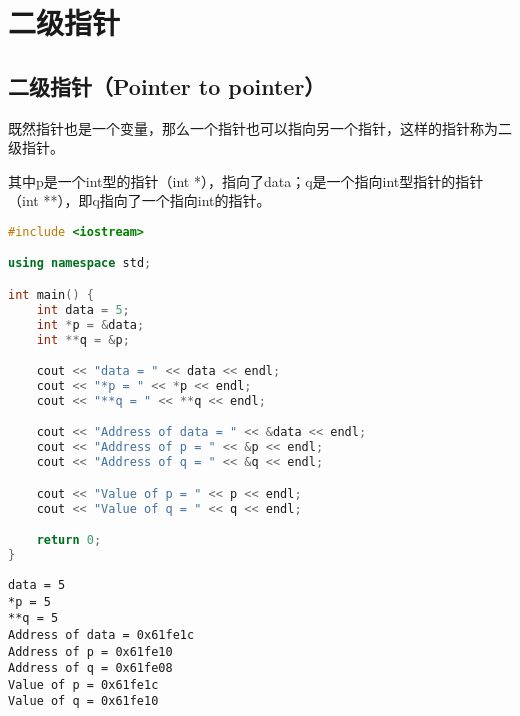 \section{二级指针}

\subsection{二级指针（Pointer to pointer）}

既然指针也是一个变量，那么一个指针也可以指向另一个指针，这样的指针称为二级指针。

\begin{figure}[H]
    \centering
\end{figure}

其中p是一个int型的指针（int *），指向了data；q是一个指向int型指针的指针（int **），即q指向了一个指向int的指针。\\


\begin{lstlisting}[language=C++]
#include <iostream>

using namespace std;

int main() {
    int data = 5;
    int *p = &data;
    int **q = &p;

    cout << "data = " << data << endl;
    cout << "*p = " << *p << endl;
    cout << "**q = " << **q << endl;

    cout << "Address of data = " << &data << endl;
    cout << "Address of p = " << &p << endl;
    cout << "Address of q = " << &q << endl;

    cout << "Value of p = " << p << endl;
    cout << "Value of q = " << q << endl;

    return 0;
}
\end{lstlisting}

\begin{tcolorbox}
    \begin{verbatim}
data = 5
*p = 5  
**q = 5
Address of data = 0x61fe1c
Address of p = 0x61fe10
Address of q = 0x61fe08
Value of p = 0x61fe1c
Value of q = 0x61fe10
	\end{verbatim}
\end{tcolorbox}

